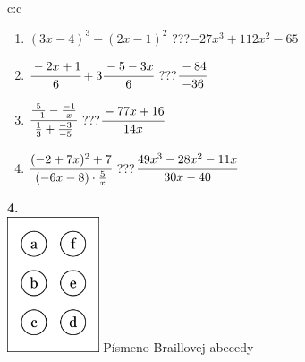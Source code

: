 \documentclass[10pt]{report}
\begin{document}
\begin{tabular}{c:c}
\begin{minipage}[c][104.5mm][t]{0.5\linewidth}
\begin{center}
\begin{minipage}{0.79\linewidth}
\begin{center}
\begin{varwidth}{\linewidth}
\begin{enumerate}
\item $(3x-4)^3-(2x-1)^2$\quad \dotfill\; ???\;\dotfill \quad $-27x^3+112x^2-65$
\item $\cfrac{-2x+1}{6}+3\cfrac{-5-3x}{6}$\quad \dotfill\; ???\;\dotfill \quad $\cfrac{-84}{-36}$
\item $\cfrac{\frac{5}{-1}-\frac{-1}{x}}{\frac{1}{3}+\frac{-3}{-5}}$\quad \dotfill\; ???\;\dotfill \quad $\cfrac{-77x+16}{14x}$
\item $\cfrac{(-2+7x)^2+7}{(-6x-8)\cdot\frac{5}{x}}$\quad \dotfill\; ???\;\dotfill \quad $\cfrac{49x^3-28x^2-11x}{30x-40}$
\end{enumerate}
\end{varwidth}
\end{center}
\end{minipage}
\begin{minipage}{0.20\linewidth}
\begin{center}
{\Huge\bfseries 4.} \\[2mm]
\includegraphics[height=40mm]{../images/braille.png}
{\small Písmeno Braillovej abecedy}
\end{center}
\end{minipage}
\end{center}
\end{minipage}
%
\end{tabular}
\newpage
\end{document}
